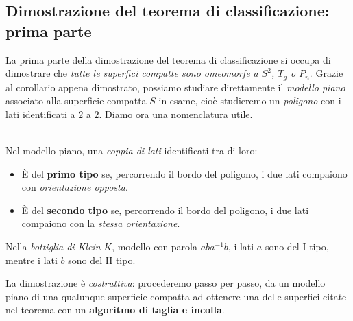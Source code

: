 \subsection{Dimostrazione del teorema di classificazione: prima parte}
La prima parte della dimostrazione del teorema di classificazione si occupa di dimostrare che \textit{tutte le superfici compatte sono omeomorfe a $S^2$, $T_g$ o $P_n$}. Grazie al corollario appena dimostrato, possiamo studiare direttamente il \textit{modello piano} associato alla superficie compatta $S$ in esame, cioè studieremo un \textit{poligono} con i lati identificati a $2$ a $2$. Diamo ora una nomenclatura utile.
\begin{define}~{}\\
	Nel modello piano, una \textit{coppia di lati} identificati tra di loro:
	\begin{itemize}
		\item È del \textbf{primo tipo} se, percorrendo il bordo del poligono, i due lati compaiono con \textit{orientazione opposta}.
		\item È del \textbf{secondo tipo} se, percorrendo il bordo del poligono, i due lati compaiono con la \textit{stessa orientazione}.
	\end{itemize}
\vspace{-3mm}
\end{define}
\begin{example}
	Nella \textit{bottiglia di Klein} $K$, modello con parola $aba^{-1}b$, i lati $a$ sono del I tipo, mentre i lati $b$ sono del II tipo.
\end{example}
La dimostrazione è \textit{costruttiva}: procederemo passo per passo, da un modello piano di una qualunque superficie compatta ad ottenere una delle superfici citate nel teorema con un \textbf{algoritmo di taglia e incolla}.
